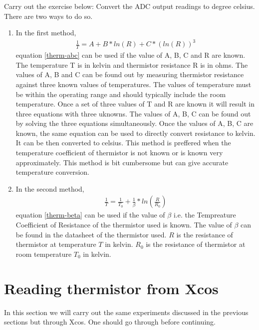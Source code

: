 \begin{enumerate}
\begin{exercise}
Carry out the exercise below:
Convert the ADC output readings to degree celsius. There are two ways to do so.
\begin{enumerate}
\item  In the first method,
\begin{align}
\frac{1}{T}=A+B*ln(R)+C*(ln(R))^3
\label{therm-abc}
\end{align}
equation \ref{therm-abc} can be used if the value of A, B, C and R are known. The temperature T is in kelvin and thermistor resistance R is in ohms. The values of A, B and C can be found out by measuring thermistor resistance against three known values of temperatures. The values of temperature must be within the operating range and should typically include the room temperature. Once a set of three values of T and R are known it will result in three equations with three uknowns. The values of A, B, C can be found out by solving the three equations simultaneously. Once the values of A, B, C are known, the same equation can be used to directly convert resistance to kelvin. It can be then converted to celsius. This method is preffered when the temperature coefficient of thermistor is not known or is known very approximately. This method is bit cumbersome but can give accurate temperature conversion. 

\item In the second method,
\begin{align}
\frac{1}{T}=\frac{1}{T_0}+\frac{1}{\beta}*ln\left(\frac{R}{R_0}\right)
\label{therm-beta}
\end{align}
equation \ref{therm-beta} can be used if the value of $\beta$ i.e. the Tempreature Coefficient of Resistance of the thermistor used is known. The value of $\beta$ can be found in the datasheet of the thermistor used. $R$ is the resistance of thermistor at temperature $T$ in kelvin.  $R_0$ is the resistance of thermistor at room temperature $T_0$ in kelvin. 
\end{enumerate}
\end{exercise}

\end{enumerate}


\section{Reading thermistor from Xcos}
In this section we will carry out the same experiments discussed in the previous sections but through Xcos. One should go through  before continuing.

